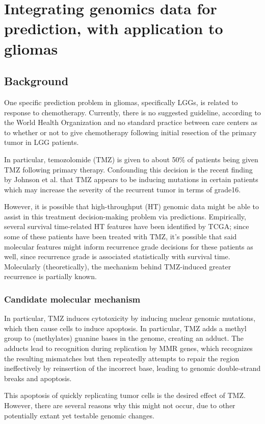 \chapter{Integrating genomics data for prediction, with application to gliomas}

\section{Background}

One specific prediction problem in gliomas, specifically LGGs, is related to response to chemotherapy. Currently, there is no suggested guideline, according to the World Health Organization and no standard practice between care centers as to whether or not to give chemotherapy following initial resection of the primary tumor in LGG patients.

In particular, temozolomide (TMZ) is given to about 50\% of patients being given TMZ following 
primary therapy. Confounding this decision is the recent finding by Johnson et al. that TMZ appears to be inducing mutations in certain patients which may increase the severity of the recurrent tumor in terms of grade16. 

However, it is possible that high-throughput (HT) genomic data might be able to assist in this treatment decision-making problem via predictions. Empirically, several survival time-related HT features have been identified by TCGA; since some of these patients have been treated with TMZ, it’s possible that said molecular features might inform recurrence grade decisions for these patients as well, since recurrence grade is associated statistically with survival time. 
Molecularly (theoretically), the mechanism behind TMZ-induced greater recurrence is partially known.

\subsection{Candidate molecular mechanism}
In particular, TMZ induces cytotoxicity by inducing nuclear genomic mutations, which then cause cells to induce apoptosis. In particular, TMZ adds a methyl group to (methylates) guanine bases in the genome, creating an adduct. The adducts lead to recognition during replication by MMR genes, which recognizes the resulting mismatches but then repeatedly attempts to repair the region ineffectively by reinsertion of the incorrect base, leading to genomic double-strand breaks and apoptosis. 

This apoptosis of quickly replicating tumor cells is the desired effect of TMZ. However, there are several reasons why this might not occur, due to other potentially extant yet testable genomic changes.

